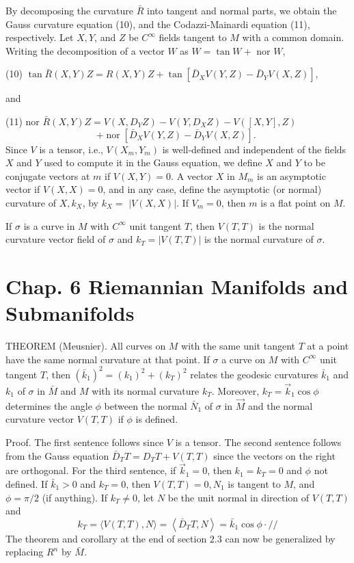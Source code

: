 \documentclass[10pt]{article}
\begin{document}
By decomposing the curvature $\bar{R}$ into tangent and normal parts, we obtain the Gauss curvature equation (10), and the Codazzi-Mainardi equation (11), respectively. Let $X, Y$, and $Z$ be $C^{\infty}$ fields tangent to $M$ with a common domain. Writing the decomposition of a vector $W$ as $W=\tan W+$ nor $W$,

(10) $\tan \bar{R}(X, Y) Z=R(X, Y) Z+\tan \left[\bar{D}_{X} V(Y, Z)-\bar{D}_{Y} V(X, Z)\right]$,

and

(11) nor $\bar{R}(X, Y) Z=V\left(X, D_{Y} Z\right)-V\left(Y, D_{X} Z\right)-V([X, Y], Z)$
$$
+\operatorname{nor}\left[\bar{D}_{X} V(Y, Z)-\bar{D}_{Y} V(X, Z)\right] \text {. }
$$
Since $V$ is a tensor, i.e., $V\left(X_{m}, Y_{m}\right)$ is well-defined and independent of the fields $X$ and $Y$ used to compute it in the Gauss equation, we define $X$ and $Y$ to be conjugate vectors at $m$ if $V(X, Y)=0$. A vector $X$ in $M_{m}$ is an asymptotic vector if $V(X, X)=0$, and in any case, define the asymptotic (or normal) curvature of $X, k_{X}$, by $k_{X}=$ $|V(X, X)|$. If $V_{m}=0$, then $m$ is a flat point on $M$.

If $\sigma$ is a curve in $M$ with $C^{\infty}$ unit tangent $T$, then $V(T, T)$ is the normal curvature vector field of $\sigma$ and $k_{T}=|V(T, T)|$ is the normal curvature of $\sigma$.

\section{Chap. 6 Riemannian Manifolds and Submanifolds}
THEOREM (Meusnier). All curves on $M$ with the same unit tangent $T$ at a point have the same normal curvature at that point. If $\sigma$ a curve on $M$ with $C^{\infty}$ unit tangent $T$, then $\left(\bar{k}_{1}\right)^{2}=\left(k_{1}\right)^{2}+\left(k_{T}\right)^{2}$ relates the geodesic curvatures $\bar{k}_{1}$ and $k_{1}$ of $\sigma$ in $\bar{M}$ and $M$ with its normal curvature $k_{T}$. Moreover, $k_{T}=\vec{k}_{1} \cos \phi$ determines the angle $\phi$ between the normal $\bar{N}_{1}$ of $\sigma$ in $\vec{M}$ and the normal curvature vector $V(T, T)$ if $\phi$ is defined.

Proof. The first sentence follows since $V$ is a tensor. The second sentence follows from the Gauss equation $\bar{D}_{T} T=D_{T} T+V(T, T)$ since the vectors on the right are orthogonal. For the third sentence, if $\vec{k}_{1}=0$, then $k_{1}=k_{T}=0$ and $\phi$ not defined. If $\bar{k}_{1}>0$ and $k_{T}=0$, then $V(T, T)=0, N_{1}$ is tangent to $M$, and $\phi=\pi / 2$ (if anything). If $k_{T} \neq 0$, let $N$ be the unit normal in direction of $V(T, T)$ and
$$
k_{T}=\langle V(T, T), N\rangle=\left\langle\bar{D}_{T} T, N\right\rangle=\bar{k}_{1} \cos \phi \cdot / /
$$
The theorem and corollary at the end of section $2.3$ can now be generalized by replacing $R^{n}$ by $\bar{M}$.
\end{document}
